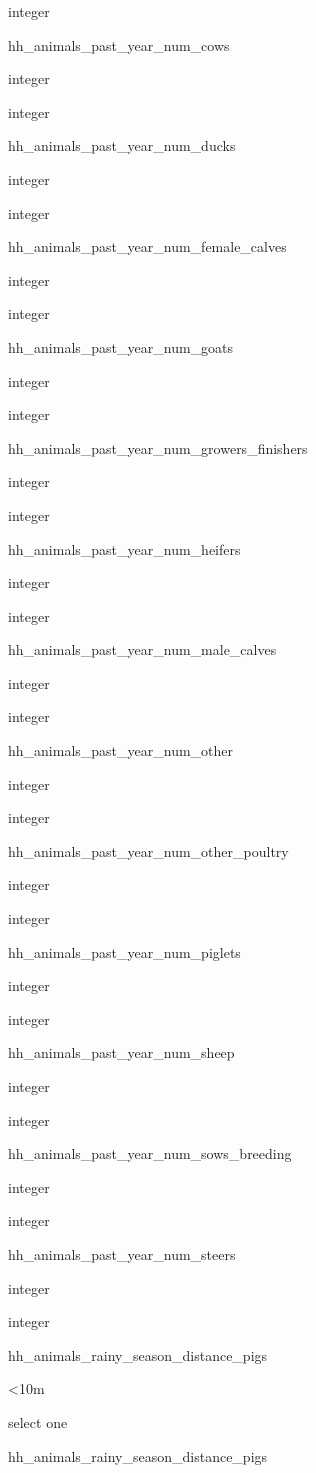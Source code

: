 \documentclass[]{article}
\begin{document}
integer

hh\_animals\_past\_year\_num\_cows

integer

integer

hh\_animals\_past\_year\_num\_ducks

integer

integer

hh\_animals\_past\_year\_num\_female\_calves

integer

integer

hh\_animals\_past\_year\_num\_goats

integer

integer

hh\_animals\_past\_year\_num\_growers\_finishers

integer

integer

hh\_animals\_past\_year\_num\_heifers

integer

integer

hh\_animals\_past\_year\_num\_male\_calves

integer

integer

hh\_animals\_past\_year\_num\_other

integer

integer

hh\_animals\_past\_year\_num\_other\_poultry

integer

integer

hh\_animals\_past\_year\_num\_piglets

integer

integer

hh\_animals\_past\_year\_num\_sheep

integer

integer

hh\_animals\_past\_year\_num\_sows\_breeding

integer

integer

hh\_animals\_past\_year\_num\_steers

integer

integer

hh\_animals\_rainy\_season\_distance\_pigs

\textless{}10m

select one

hh\_animals\_rainy\_season\_distance\_pigs
\end{document}
